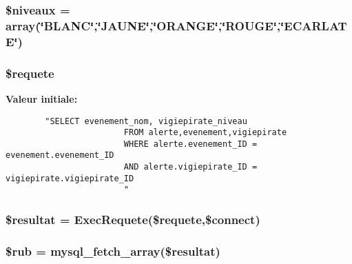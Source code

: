 \hypertarget{init_8php_a5}{
\subsubsection[\$niveaux]{\setlength{\rightskip}{0pt plus 5cm}\$niveaux = array(\char`\"{}BLANC\char`\"{},\char`\"{}JAUNE\char`\"{},\char`\"{}ORANGE\char`\"{},\char`\"{}ROUGE\char`\"{},\char`\"{}ECARLATE\char`\"{})}}
\label{init_8php_a5}


\hypertarget{init_8php_a2}{
\subsubsection[\$requete]{\setlength{\rightskip}{0pt plus 5cm}\$requete}}
\label{init_8php_a2}


{\bf Valeur initiale:}

\footnotesize\begin{verbatim}        "SELECT evenement_nom, vigiepirate_niveau
                        FROM alerte,evenement,vigiepirate
                        WHERE alerte.evenement_ID = evenement.evenement_ID
                        AND alerte.vigiepirate_ID = vigiepirate.vigiepirate_ID
                        "
\end{verbatim}\normalsize 
\hypertarget{init_8php_a3}{
\subsubsection[\$resultat]{\setlength{\rightskip}{0pt plus 5cm}\$resultat = Exec\-Requete(\$requete,\$connect)}}
\label{init_8php_a3}


\hypertarget{init_8php_a4}{
\subsubsection[\$rub]{\setlength{\rightskip}{0pt plus 5cm}\$rub = mysql\_\-fetch\_\-array(\$resultat)}}
\label{init_8php_a4}



